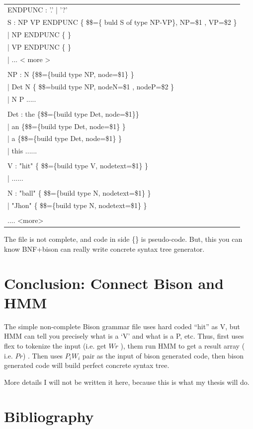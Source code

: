 \setlength{\parwidth}{\linewidth}%
\addtolength{\parwidth}{-1.5\parindent}%
\begin{flushright} \tt
\begin{longtable}{|m{\parwidth}|}\hline

ENDPUNC : '.' | '?'  \\

S : NP VP ENDPUNC \{ \$\$=\{ buld S of type NP-VP\}, NP=\$1 , VP=\$2   \}\\
	\qquad	| NP ENDPUNC \{  \}\\
	\qquad	| VP ENDPUNC  \{  \}\\
	\qquad	| ...  < more >  \\ 
\\
NP : N \{\$\$=\{build type NP, node=\$1\} \} \\
\qquad	| Det N \{ \$\$={build type NP, nodeN=\$1 , nodeP=\$2} \} \\
\qquad	| N P ..... \\ 
\\
Det : the  \{\$\$=\{build type Det, node=\$1\}\} \\
\qquad	| an  \{\$\$=\{build type Det, node=\$1\} \} \\
\qquad	| a \{\$\$=\{build type Det, node=\$1\} \} \\
\qquad	| this ...... \\
\\
V : "hit"  \{ \$\$=\{build type V, nodetext=\$1\} \} \\
\qquad	| ...... \\
\\
N : "ball" \{ \$\$=\{build type N, nodetext=\$1\} \} \\
\qquad	| "Jhon" \{ \$\$=\{build type N, nodetext=\$1\} \}  \\
\\
.... <more> \\
\end{longtable}
\end{flushright}

The file is not complete, and code in side \{\} is pseudo-code. But, this you can know BNF+bison 
can really write concrete syntax tree generator. 

\section{Conclusion: Connect Bison and HMM}

The simple non-complete Bison grammar file uses hard coded ``hit'' as V, but HMM can tell you  precisely what is a `V'  and what is a P, etc. Thus, first uses flex to tokenize the input (i.e. get $Wr$ ), them run HMM to get a result array ( i.e. $Pr$) . Then uses $P_{i}W_i$ pair as the
input of bison generated code, then bison generated code will build perfect concrete syntax tree.

More details I will not be written it here, because this is what my thesis will do.

\section{Bibliography}
\nocite{GPL}


